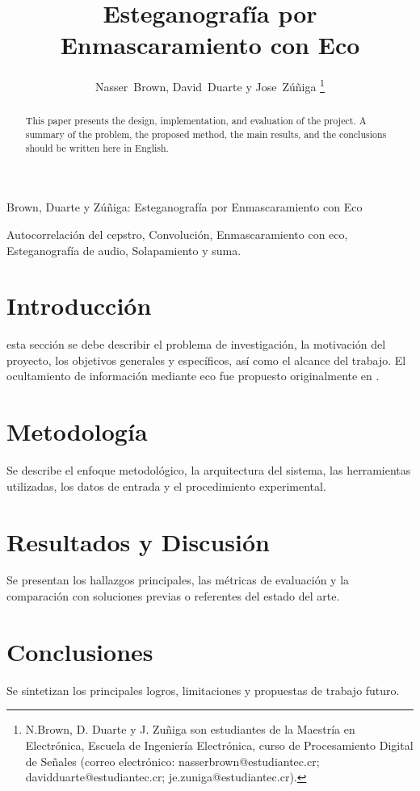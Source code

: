 \documentclass[journal]{IEEEtran}
\begin{document}
 
\title{Esteganografía por Enmascaramiento con Eco}
 
\author{Nasser~Brown, David~Duarte y Jose~Zúñiga%
\thanks{N.Brown, D. Duarte y J. Zuñiga son estudiantes de la Maestría en Electrónica,
Escuela de Ingeniería Electrónica, curso de Procesamiento Digital de Señales
(correo electrónico: nasserbrown@estudiantec.cr; davidduarte@estudiantec.cr; je.zuniga@estudiantec.cr).}}
 
%
{Brown, Duarte y Zúñiga: Esteganografía por Enmascaramiento con Eco}
 
\maketitle
 
\begin{abstract}
This paper presents the design, implementation, and evaluation of the project.
A summary of the problem, the proposed method, the main results, and the
conclusions should be written here in English.
\end{abstract}
 
\begin{IEEEkeywords}
Autocorrelación del cepstro, Convolución, Enmascaramiento con eco,
Esteganografía de audio, Solapamiento y suma.
\end{IEEEkeywords}
 
\section{Introducción}
 esta sección se debe describir el problema de investigación,
la motivación del proyecto, los objetivos generales y específicos, así como el
alcance del trabajo. El ocultamiento de información mediante eco fue propuesto
originalmente en \cite{gruhl1996echo,bender1996techniques}.
 
\section{Metodología}
Se describe el enfoque metodológico, la arquitectura del sistema, las
herramientas utilizadas, los datos de entrada y el procedimiento experimental.
 
\section{Resultados y Discusión}
Se presentan los hallazgos principales, las métricas de evaluación y la
comparación con soluciones previas o referentes del estado del arte.
 
\section{Conclusiones}
Se sintetizan los principales logros, limitaciones y propuestas de trabajo
futuro.
 


 
\end{document}
